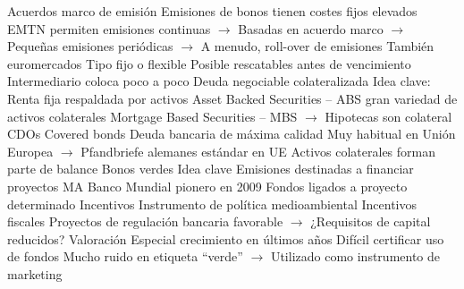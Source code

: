 \documentclass{nuevotema}
\begin{document}
\begin{esquemal}
				\4 Acuerdos marco de emisión
				\4[] Emisiones de bonos tienen costes fijos elevados
				\4[] EMTN permiten emisiones continuas
				\4[] $\to$ Basadas en acuerdo marco
				\4[] $\to$ Pequeñas emisiones periódicas
				\4[] $\to$ A menudo, roll-over de emisiones
				\4 También euromercados
				\4 Tipo fijo o flexible
				\4 Posible rescatables antes de vencimiento
				\4 Intermediario coloca poco a poco
			\3 Deuda negociable colateralizada
				\4 Idea clave:
				\4[] Renta fija respaldada por activos
				\4 Asset Backed Securities -- ABS
				\4[] gran variedad de activos colaterales
				\4[] Mortgage Based Securities -- MBS
				\4[] $\to$ Hipotecas son colateral
				\4 CDOs
				\4 Covered bonds
				\4[] Deuda bancaria de máxima calidad
				\4[] Muy habitual en Unión Europea
				\4[] $\to$ Pfandbriefe alemanes estándar en UE
				\4[] Activos colaterales forman parte de balance
			\3 Bonos verdes
				\4 Idea clave
				\4[] Emisiones destinadas a financiar proyectos MA
				\4[] Banco Mundial pionero en 2009
				\4[] Fondos ligados a proyecto determinado
				\4 Incentivos
				\4[] Instrumento de política medioambiental
				\4[] Incentivos fiscales
				\4[] Proyectos de regulación bancaria favorable
				\4[] $\to$ ¿Requisitos de capital reducidos?
				\4 Valoración
				\4[] Especial crecimiento en últimos años
				\4[] Difícil certificar uso de fondos
				\4[] Mucho ruido en etiqueta ``verde''
				\4[] $\to$ Utilizado como instrumento de marketing


\end{esquemal}
\end{document}
